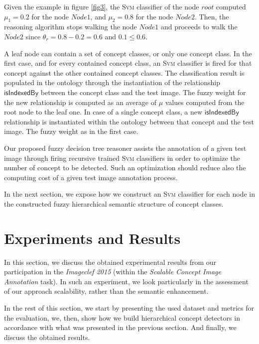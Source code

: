 Given the example in figure \ref{fig3}, the \textsc{Svm} classifier of the node $root$ computed $\mu_{1} = 0.2$ for the node $Node1$, and 
$\mu_{2} = 0.8$ for the node $Node2$. Then, the reasoning algorithm stops walking the node $Node1$ and proceeds to walk the $Node2$ since
$\theta_{r} = 0.8-0.2 = 0.6$ and $0.1 \leq 0.6$.

A leaf node can contain a set of concept classes, or only one concept class. In the first case, and for every contained concept class, an \textsc{Svm} classifier is fired for that concept against the other contained concept classes. The classification result is populated in the ontology through the instantiation of the relationship $\mathsf{isIndexedBy}$ between the concept class and the test image. The fuzzy weight for the new relationship is computed as an average of $\mu$ values computed from the root node to the leaf one. 
 In case of a single concept class, a new $\mathsf{isIndexedBy}$ relationship is instantiated within the ontology between that concept and the test image. The fuzzy weight  as in the first case.

Our proposed fuzzy decision tree reasoner assists the annotation of a given test image through firing recursive trained \textsc{Svm} classifiers in order to optimize the number of concept to be detected. Such an optimization should reduce also the computing cost of a given test image annotation process.

In the next section, we expose how we construct an \textsc{Svm} classifier for each node in the constructed fuzzy hierarchical semantic structure of concept classes.


	\section{Experiments and Results}
	\label{c3_3}
		
		In this section, we discuss the obtained experimental results from our participation in the 
		\textit{Imageclef 2015} (within the \textit{Scalable Concept Image Annotation} task).
		In such an experiment, we look particularly in the assessment of our approach scalability, 
		rather than the semantic enhancement.
		
		In the rest of this section, we start by presenting the used dataset and metrics for 
		the evaluation, we, then, show how we build hierarchical concept detectors in accordance 
		with what was presented in the previous section. And finally, we discuss the obtained results.

